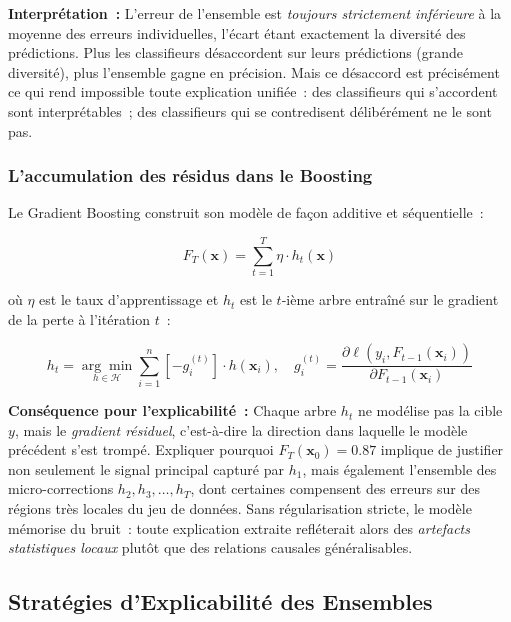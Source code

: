 \textbf{Interprétation~:} L'erreur de l'ensemble est \textit{toujours strictement inférieure}
à la moyenne des erreurs individuelles, l'écart étant exactement la diversité des
prédictions. Plus les classifieurs désaccordent sur leurs prédictions (grande diversité),
plus l'ensemble gagne en précision. Mais ce désaccord est précisément ce qui rend impossible
toute explication unifiée~: des classifieurs qui s'accordent sont interprétables~;
des classifieurs qui se contredisent délibérément ne le sont pas.

\subsubsection{L'accumulation des résidus dans le Boosting}

Le Gradient Boosting construit son modèle de façon additive et séquentielle~:

\begin{equation}
  F_T(\mathbf{x}) = \sum_{t=1}^{T} \eta \cdot h_t(\mathbf{x})
  \label{eq:gradient_boosting}
\end{equation}

où $\eta$ est le taux d'apprentissage et $h_t$ est le $t$-ième arbre entraîné sur le
gradient de la perte à l'itération $t$~:

\begin{equation}
  h_t = \underset{h \in \mathcal{H}}{\arg\min}
  \sum_{i=1}^{n} \left[-g_i^{(t)}\right] \cdot h(\mathbf{x}_i),
  \quad g_i^{(t)} = \frac{\partial \ell(y_i, F_{t-1}(\mathbf{x}_i))}{\partial F_{t-1}(\mathbf{x}_i)}
  \label{eq:gradient_residuel}
\end{equation}

\textbf{Conséquence pour l'explicabilité~:} Chaque arbre $h_t$ ne modélise pas la cible
$y$, mais le \textit{gradient résiduel}, c'est-à-dire la direction dans laquelle le modèle
précédent s'est trompé. Expliquer pourquoi $F_T(\mathbf{x}_0) = 0.87$ implique de justifier
non seulement le signal principal capturé par $h_1$, mais également l'ensemble
des micro-corrections $h_2, h_3, \ldots, h_T$, dont certaines compensent des erreurs
sur des régions très locales du jeu de données. Sans régularisation stricte, le modèle
mémorise du bruit~: toute explication extraite refléterait alors des \textit{artefacts
statistiques locaux} plutôt que des relations causales généralisables.

\subsection{Stratégies d'Explicabilité des Ensembles}

